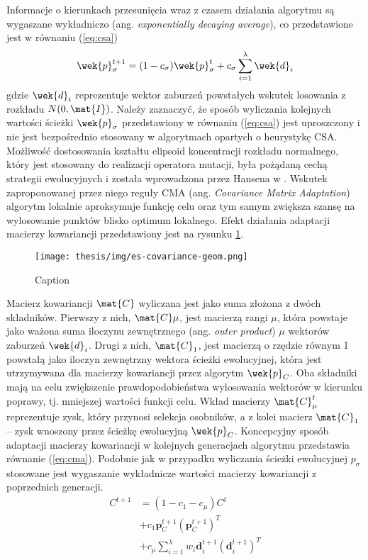     Informacje o kierunkach przesunięcia wraz z czasem działania algorytmu są wygaszane wykładniczo (ang. \textit{exponentially decaying average}), co przedstawione jest w równaniu (\ref{eq:csa})
    \begin{equation}
        \label{eq:csa}
        \wek{p}^{t+1}_{\sigma} = (1-c_\sigma)\wek{p}^{t}_{\sigma} + c_{\sigma}\sum^{\lambda}_{i = 1} \wek{d}_{i}
    \end{equation}
    gdzie $\wek{d}_i$ reprezentuje wektor zaburzeń powstałych wskutek losowania z rozkładu $N(0, \mat{I})$. Należy zaznaczyć, że sposób wyliczania kolejnych wartości ścieżki $\wek{p}_\sigma$ przedstawiony w równaniu (\ref{eq:csa}) jest uproszczony i nie jest bezpośrednio stosowany w algorytmach opartych o heurystykę CSA.\\
    \indent Możliwość dostosowania kształtu elipsoid koncentracji rozkładu normalnego, który jest stosowany do realizacji operatora mutacji, była pożądaną cechą strategii ewolucyjnych i została wprowadzona przez Hansena w \cite{Hansen:CMA}. Wskutek zaproponowanej przez niego reguły CMA (ang. \textit{Covariance Matrix Adaptation}) algorytm lokalnie aproksymuje funkcję celu oraz tym samym zwiększa szansę na wylosowanie punktów
    blisko optimum lokalnego. Efekt działania adaptacji macierzy kowariancji przedstawiony jest na rysunku \ref{fig:cma}.
    \begin{figure}
        \centering
        \texttt{[image: thesis/img/es-covariance-geom.png]}
        \caption{Caption}
        \label{fig:cma}
    \end{figure}
    Macierz kowariancji $\mat{C}$ wyliczana jest jako suma złożona z dwóch składników. Pierwszy z nich, $\mat{C}\mu$, jest macierzą rangi $\mu$, która powstaje jako ważona suma iloczynu zewnętrznego (ang. \textit{outer product}) $\mu$ wektorów zaburzeń $\wek{d}_{i}$. Drugi z nich,  $\mat{C}_1$, jest macierzą o rzędzie równym 1 powstałą jako iloczyn zewnętrzny wektora ścieżki ewolucyjnej, która jest utrzymywana dla macierzy kowariancji przez algorytm $\wek{p}_C$.  
    Oba składniki mają na celu zwiększenie prawdopodobieństwa wylosowania wektorów w kierunku poprawy, tj. mniejszej wartości funkcji celu. Wkład macierzy $\mat{C}^t_\mu$ reprezentuje zysk, który przynosi selekcja osobników, a z kolei macierz $\mat{C}_1$ -- zysk wnoszony przez ścieżkę ewolucyjną $\wek{p}_C$. Koncepcyjny sposób adaptacji macierzy kowariancji w kolejnych generacjach algorytmu przedstawia równanie
    (\ref{eq:cma}). Podobnie jak w przypadku wyliczania ścieżki ewolucyjnej $p_\sigma$ stosowane jest wygaszanie wykładnicze wartości macierzy kowariancji z poprzednich generacji. 
    \begin{equation}
    \label{eq:cma}
    \begin{split}
         C^{t+1} & = (1 - c_{1} - c_{\mu})C^{t} \\
         & + c_{1}\textbf{p}_{C}^{t+1}(\textbf{p}_{C}^{t+1})^{T} \\
        & + c_{\mu}\sum^{\lambda}_{i =1}w_{i}\textbf{d}_{i}^{t+1}(\textbf{d}_{i}^{t+1})^{T} \\
    \end{split}
  \end{equation}
  
